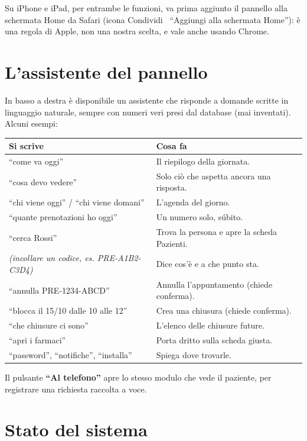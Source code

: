\documentclass[11pt,a4paper]{article}
\newcommand{\bottone}[1]{\textbf{``#1''}}
\begin{document}
Su iPhone e iPad, per entrambe le funzioni, va prima aggiunto il pannello alla schermata Home da Safari (icona Condividi \textrightarrow\ ``Aggiungi alla schermata Home''): è una regola di Apple, non una nostra scelta, e vale anche usando Chrome.

\section{L'assistente del pannello}

In basso a destra è disponibile un assistente che risponde a domande scritte in linguaggio naturale, sempre con numeri veri presi dal database (mai inventati). Alcuni esempi:

\begin{center}
\begin{tabularx}{\linewidth}{lX}
\toprule
\textbf{Si scrive} & \textbf{Cosa fa} \\
\midrule
``come va oggi'' & Il riepilogo della giornata. \\
``cosa devo vedere'' & Solo ciò che aspetta ancora una risposta. \\
``chi viene oggi'' / ``chi viene domani'' & L'agenda del giorno. \\
``quante prenotazioni ho oggi'' & Un numero solo, súbito. \\
``cerca Rossi'' & Trova la persona e apre la scheda Pazienti. \\
\emph{(incollare un codice, es. PRE-A1B2-C3D4)} & Dice cos'è e a che punto sta. \\
``annulla PRE-1234-ABCD'' & Annulla l'appuntamento (chiede conferma). \\
``blocca il 15/10 dalle 10 alle 12'' & Crea una chiusura (chiede conferma). \\
``che chiusure ci sono'' & L'elenco delle chiusure future. \\
``apri i farmaci'' & Porta dritto sulla scheda giusta. \\
``password'', ``notifiche'', ``installa'' & Spiega dove trovarle. \\
\bottomrule
\end{tabularx}
\end{center}

Il pulsante \bottone{Al telefono} apre lo stesso modulo che vede il paziente, per registrare una richiesta raccolta a voce.

\section{Stato del sistema}
\end{document}
